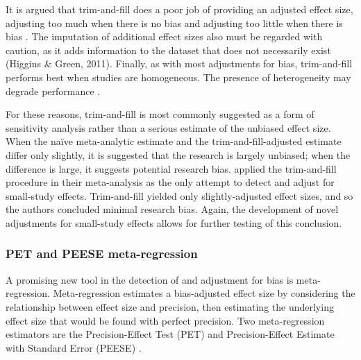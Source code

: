 \documentclass[man, mask]{apa6}
\begin{document}
It is argued that trim-and-fill does a poor job of providing an adjusted effect size, adjusting too much when there is no bias and adjusting too little when there is bias \citep{Moreno:etal:2009,Simonsohn:etal:2014b}. 
The imputation of additional effect sizes also must be regarded with caution, as it adds information to the dataset that does not necessarily exist (Higgins \& Green, 2011). Finally, as with most adjustments for bias, trim-and-fill performs best when studies are homogeneous. The presence of heterogeneity may degrade performance \citep{Terrin:etal:2003}. %
\nocite{Higgins:Green:2011}

For these reasons, trim-and-fill is most commonly suggested as a form of sensitivity analysis rather than a serious estimate of the unbiased effect size. When the na{\"i}ve meta-analytic estimate and the trim-and-fill-adjusted estimate differ only slightly, it is suggested that the research is largely unbiased; when the difference is large, it suggests potential research bias.
\citet{Anderson:etal:2010} applied the trim-and-fill procedure in their meta-analysis as the only attempt to detect and adjust for small-study effects. Trim-and-fill yielded only slightly-adjusted effect sizes, and so the authors concluded minimal research bias.
Again, the development of novel adjustments for small-study effects allows for further testing of this conclusion.

\subsubsection{PET and PEESE meta-regression}
A promising new tool in the detection of and adjustment for bias is meta-regression. Meta-regression estimates a bias-adjusted effect size by considering the relationship between effect size and precision, then estimating the underlying effect size that would be found with perfect precision. Two meta-regression estimators are the Precision-Effect Test (PET) and Precision-Effect Estimate with Standard Error (PEESE) \citep{Stanley:Doucouliagos:2014}. 
\end{document}
